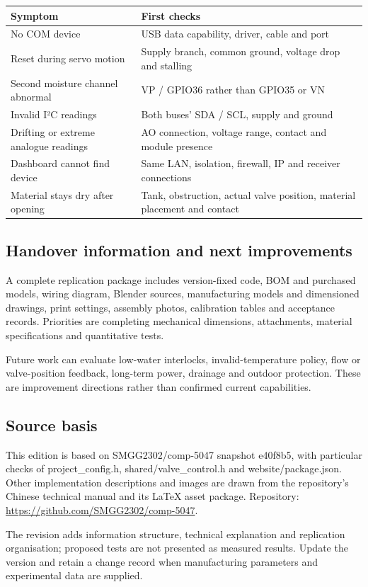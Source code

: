 \documentclass[10pt,a4paper]{article}
\begin{document}
\begin{longtable}{>{\raggedright\arraybackslash}p{54mm}>{\raggedright\arraybackslash}p{111mm}}
\toprule
\textbf{Symptom} & \textbf{First checks}\\\midrule\endhead
No COM device & USB data capability, driver, cable and port\\
Reset during servo motion & Supply branch, common ground, voltage drop and stalling\\
Second moisture channel abnormal & VP / GPIO36 rather than GPIO35 or VN\\
Invalid I²C readings & Both buses' SDA / SCL, supply and ground\\
Drifting or extreme analogue readings & AO connection, voltage range, contact and module presence\\
Dashboard cannot find device & Same LAN, isolation, firewall, IP and receiver connections\\
Material stays dry after opening & Tank, obstruction, actual valve position, material placement and contact\\
\bottomrule\end{longtable}

\subsection{Handover information and next improvements}

A complete replication package includes version-fixed code, BOM and purchased models, wiring diagram, Blender sources, manufacturing models and dimensioned drawings, print settings, assembly photos, calibration tables and acceptance records. Priorities are completing mechanical dimensions, attachments, material specifications and quantitative tests.


Future work can evaluate low-water interlocks, invalid-temperature policy, flow or valve-position feedback, long-term power, drainage and outdoor protection. These are improvement directions rather than confirmed current capabilities.


\subsection{Source basis}

This edition is based on SMGG2302/comp-5047 snapshot e40f8b5, with particular checks of project\_config.h, shared/valve\_control.h and website/package.json. Other implementation descriptions and images are drawn from the repository's Chinese technical manual and its LaTeX asset package. Repository: \url{https://github.com/SMGG2302/comp-5047}.


The revision adds information structure, technical explanation and replication organisation; proposed tests are not presented as measured results. Update the version and retain a change record when manufacturing parameters and experimental data are supplied.
\end{document}
